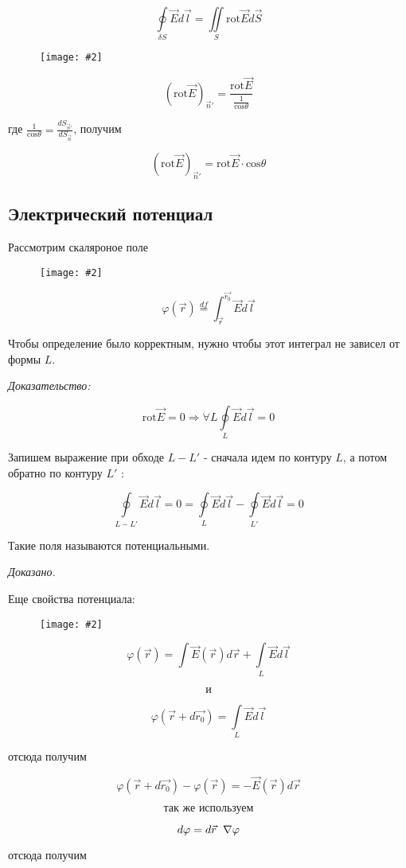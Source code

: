 \documentclass[a4paper,12pt]{article}
\newcommand{\kr}[1]{\textit{#1}}
\newcommand{\fc}[1]{\[#1\]}
\newcommand{\mm}[1]{\mathrm{#1}}
\newcommand{\gradd}{\hspace{0.2cm}\scriptsize \nabla}
\newcommand{\imc}[2][0.7\textwidth]{%
    \begin{figure}[h!]
        \centering
        \texttt{[image: \#2]}
    \end{figure}%
}
\begin{document}
\fc{\underset{\delta
S}{\oint}\vec{E}d\vec{l}=\underset{S}{\iint}\mm{rot}\vec{E}d\vec{S}}

\imc[0.5\textwidth]{6.png}

\fc{(\mm{rot}\vec{E})_{\vec{n}'}=\frac{\mm{rot}\vec{E}}{\frac{1}{\mm{cos}\theta
}}}

где $\frac{1}{\mm{cos}\theta}=\frac{dS_{\vec{n}'}}{dS_{\vec{n}}}$, получим

\fc{(\mm{rot}\vec{E})_{\vec{n}'}=\mm{rot}\vec{E}\cdot\mm{cos}\theta} 


\subsection*{Электрический потенциал}

Рассмотрим скаляроное поле

\imc[0.5\textwidth]{7.png}

\fc{\varphi(\vec{r})\overset{df}{=}\int_{\vec{r}}^{\vec{r_0}}\vec{E}d\vec{l}}

Чтобы определение было корректным, нужно чтобы этот интеграл не зависел от
формы $L$.

\kr{Доказательство:}

\fc{\mm{rot}\vec{E}=0 \Rightarrow \forall L
\underset{L}{\oint}\vec{E}d\vec{l}=0}

Запишем выражение при обходе $L-L'$ - сначала идем по контуру $L$, а
потом обратно по контуру $L'$ : 

\fc{\underset{L-L'}{\oint}\vec{E}d\vec{l}=0=\underset{L}{\oint}\vec{E}d\vec{l}
-\underset{L'}{\oint}\vec{E}d\vec{l}=0}

Такие поля называются потенциальными.

\kr{Доказано.}

Еще свойства потенциала: 

\imc[0.35\textwidth]{8.png}
   
\fc{\varphi(\vec{r})=\int \vec{E}(\vec{r})d\vec{r} + \underset{L}{\int}
\vec{E}d\vec{l} }

\fc{\text{и}}

\fc{\varphi(\vec{r}+d\vec{r_0})=\underset{L}{\int} \vec{E}d\vec{l}}
 
отсюда получим

\fc{\varphi(\vec{r}+d\vec{r_0})-\varphi(\vec{r})=-\vec{E}(\vec{r})d\vec{r}}

\fc{\text{так же используем}}

\fc{d\varphi=d\vec{r}\gradd \varphi }

отсюда получим
\end{document}
